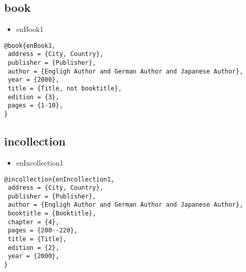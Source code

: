 \documentclass[9pt, twocolumn, a4paper]{jsarticle}
\begin{document}
\begin{bibunit}[jIEEEtran]
\subsection{book}

\begin{itemize}
  \item enBook1 \cite{enBook1}
\end{itemize}

\begin{lstlisting}
@book{enBook1,
 address = {City, Country},
 publisher = {Publisher},
 author = {Engligh Author and German Author and Japanese Author},
 year = {2000},
 title = {Title, not booktitle},
 edition = {3},
 pages = {1-10},
}
\end{lstlisting}

\subsection{incollection}

\begin{itemize}
  \item enIncollection1 \cite{enIncollection1}
\end{itemize}

\begin{lstlisting}
@incollection{enIncollection1,
 address = {City, Country},
 publisher = {Publisher},
 author = {Engligh Author and German Author and Japanese Author},
 booktitle = {Booktitle},
 chapter = {4},
 pages = {200--220},
 title = {Title},
 edition = {2},
 year = {2000},
}
\end{lstlisting}

{\footnotesize \putbib[samplebib]}
\end{bibunit}

\clearpage
\end{document}
